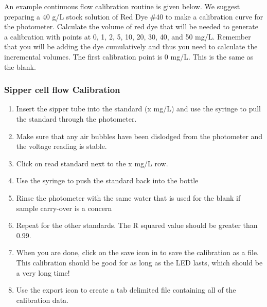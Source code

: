 \documentclass[letterpaper,10pt,english]{sphinxmanual}
\begin{document}
An example continuous flow calibration routine is given below. We suggest preparing a 40 g/L stock solution of Red Dye \#40 to make a calibration curve for the photometer. Calculate the volume of red dye that will be needed to generate a calibration with points at 0, 1, 2, 5, 10, 20, 30, 40, and 50 mg/L. Remember that you will be adding the dye cumulatively and thus you need to calculate the incremental volumes. The first calibration point is 0 mg/L. This is the same as the blank.


\subsubsection{Sipper cell flow Calibration}
\label{\detokenize{ProCoDA/ProCoDA:sipper-cell-flow-calibration}}\begin{enumerate}
\item {} 
Insert the sipper tube into the standard (x mg/L) and use the syringe to pull the standard through the photometer.

\item {} 
Make sure that any air bubbles have been dislodged from the photometer and the voltage reading is stable.

\item {} 
Click on read standard next to the x mg/L row.

\item {} 
Use the syringe to push the standard back into the bottle

\item {} 
Rinse the photometer with the same water that is used for the blank if sample carry-over is a concern

\item {} 
Repeat for the other standards. The R squared value should be greater than 0.99.

\item {} 
When you are done, click on the save icon in  to save the calibration as a file. This calibration should be good for as long as the LED lasts, which should be a very long time!

\item {} 
Use the export icon to create a tab delimited file containing all of the calibration data.

\end{enumerate}
\end{document}
